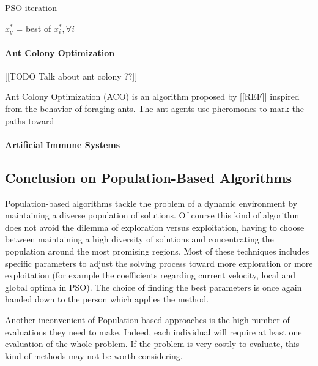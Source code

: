 \begin{algorithm}
\caption{PSO iteration}\label{PSO_algo}
\begin{algorithmic}

	$x_g^*$ = best of $x_i^*, \forall i$\;

\end{algorithmic}
\end{algorithm}

\paragraph*{Ant Colony Optimization}

[[TODO Talk about ant colony ??]]

Ant Colony Optimization (ACO) is an algorithm proposed by [[REF]] inspired from the behavior of foraging ants. The ant agents use pheromones to mark the paths toward 

\paragraph*{Artificial Immune Systems}

\subsection{Conclusion on Population-Based Algorithms}

Population-based algorithms tackle the problem of a dynamic environment by maintaining a diverse population of solutions. Of course this kind of algorithm does not avoid the dilemma of exploration versus exploitation, having to choose between maintaining a high diversity of solutions and concentrating the population around the most promising regions. Most of these techniques includes specific parameters to adjust the solving process toward more exploration or more exploitation (for example the coefficients regarding current velocity, local and global optima in PSO). The choice of finding the best parameters is once again handed down to the person which applies the method.

Another inconvenient of Population-based approaches is the high number of evaluations they need to make. Indeed, each individual will require at least one evaluation of the whole problem. If the problem is very costly to evaluate, this kind of methods may not be worth considering.

